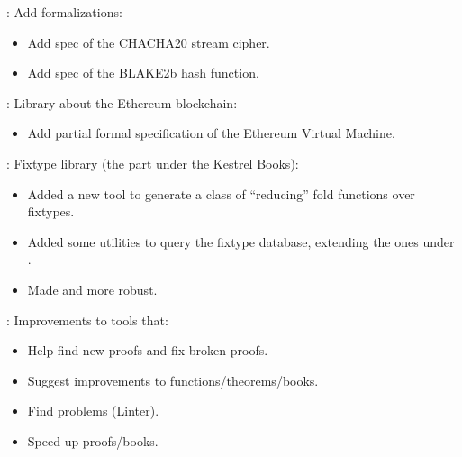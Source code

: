 
\begin{frame}

\implibtitle

:
Add formalizations:
\begin{itemize}
\item Add spec of the CHACHA20 stream cipher.
\item Add spec of the BLAKE2b hash function.
\end{itemize}

\end{frame}


\begin{frame}

\implibtitle

:
Library about the Ethereum blockchain:
\begin{itemize}
\item Add partial formal specification of the Ethereum Virtual Machine.
\end{itemize}

\end{frame}


\begin{frame}

\implibtitle

:
Fixtype library (the part under the Kestrel Books):
\begin{itemize}
\item Added a new  tool
      to generate a class of ``reducing'' fold functions over fixtypes.
\item Added some utilities to query the fixtype database,
      extending the ones under .
\item Made  and  more robust.
\end{itemize}

\end{frame}


\begin{frame}

\implibtitle

:
Improvements to tools that:
\begin{itemize}
\item Help find new proofs and fix broken proofs.
\item Suggest improvements to functions/theorems/books.
\item Find problems (Linter).
\item Speed up proofs/books.
\end{itemize}

\end{frame}

